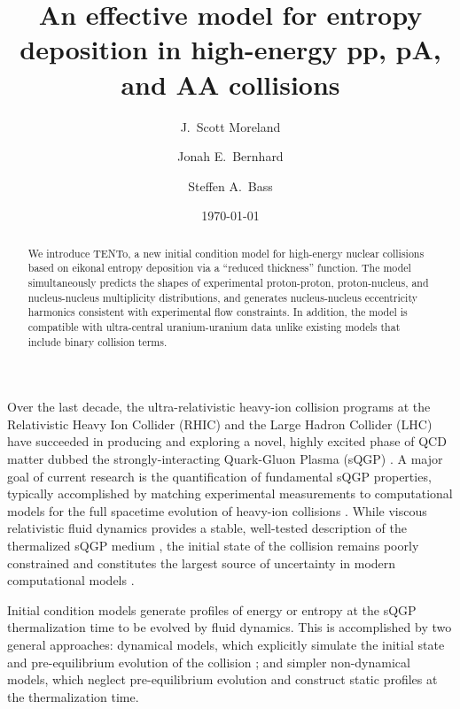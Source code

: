 \documentclass[aps,prc,reprint,amsmath,nofootinbib]{revtex4-1}
\newcommand{\psec}[1]{\phantomsection\addcontentsline{toc}{section}{#1}}
\newcommand{\trento}{T\raisebox{-.5ex}{R}ENTo}
\begin{document}
\title{An effective model for entropy deposition in high-energy pp, pA, and AA collisions}

\author{J.\ Scott Moreland}
\author{Jonah E.\ Bernhard}
\author{Steffen A.\ Bass}

\date{\today}


\begin{abstract}
  We introduce \trento, a new initial condition model for high-energy nuclear collisions based on eikonal entropy deposition via a ``reduced thickness'' function.
  The model simultaneously predicts the shapes of experimental proton-proton, proton-nucleus, and nucleus-nucleus multiplicity distributions, and generates nucleus-nucleus eccentricity harmonics consistent with experimental flow constraints.
  In addition, the model is compatible with ultra-central uranium-uranium data unlike existing models that include binary collision terms.
\end{abstract}


\maketitle

\psec{Introduction}

Over the last decade, the ultra-relativistic heavy-ion collision programs at the Relativistic Heavy Ion Collider (RHIC) and the Large Hadron Collider (LHC) have succeeded in producing and exploring a novel, highly excited phase of QCD matter dubbed the strongly-interacting Quark-Gluon Plasma (sQGP)
\cite{Arsene:2004fa,Adcox:2004mh,Back:2004je,Adams:2005dq,Gyulassy:2004zy,Muller:2006ee,Muller:2012zq}.
A major goal of current research is the quantification of fundamental sQGP properties, typically accomplished by matching experimental measurements to computational models for the full spacetime evolution of heavy-ion collisions \cite{Petersen:2010zt,Novak:2013bqa}.
While viscous relativistic fluid dynamics provides a stable, well-tested description of the thermalized sQGP medium \cite{Baier:2006gy,Song:2007ux,Luzum:2008cw,Schenke:2010rr,Shen:2011eg,Shen:2014vra}, the initial state of the collision remains poorly constrained and constitutes the largest source of 
uncertainty in modern computational models \cite{Song:2010mg, Retinskaya:2013gca}.

Initial condition models generate profiles of energy or entropy at the sQGP thermalization time to be evolved by fluid dynamics.
This is accomplished by two general approaches:
dynamical models, which explicitly simulate the initial state and pre-equilibrium evolution of the collision \cite{Schenke:2012wb,vanderSchee:2013pia,Berges:2014yta,Kurkela:2014tea};
and simpler non-dynamical models, which neglect pre-equilibrium evolution and construct static profiles at the thermalization time.
\end{document}
